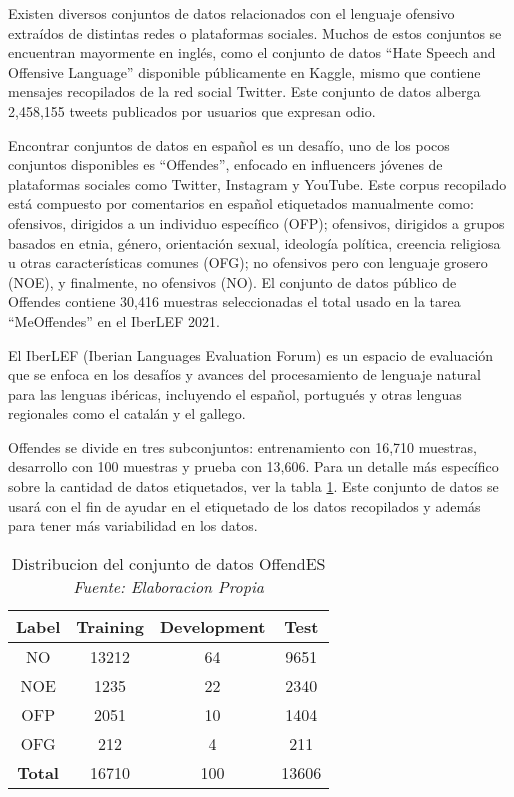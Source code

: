 Existen diversos conjuntos de datos relacionados con el lenguaje ofensivo extraídos de distintas redes o plataformas sociales. Muchos de estos conjuntos se encuentran mayormente en inglés, como el conjunto de datos ``Hate Speech and Offensive Language'' disponible públicamente en Kaggle, mismo que contiene mensajes recopilados de la red social Twitter. Este conjunto de datos alberga 2,458,155 tweets publicados por usuarios que expresan odio.

Encontrar conjuntos de datos en español es un desafío, uno de los pocos conjuntos disponibles es ``Offendes'', enfocado en influencers jóvenes de plataformas sociales como Twitter, Instagram y YouTube. Este corpus recopilado está compuesto por comentarios en español etiquetados manualmente como: ofensivos, dirigidos a un individuo específico (OFP); ofensivos, dirigidos a grupos basados en etnia, género, orientación sexual, ideología política, creencia religiosa u otras características comunes (OFG); no ofensivos pero con lenguaje grosero (NOE), y finalmente, no ofensivos (NO). El conjunto de datos público de Offendes contiene 30,416 muestras seleccionadas el total usado en la tarea ``MeOffendes'' en el IberLEF 2021. 

El IberLEF (Iberian Languages Evaluation Forum) es un espacio de evaluación que se enfoca en los desafíos y avances del procesamiento de lenguaje natural para las lenguas ibéricas, incluyendo el español, portugués y otras lenguas regionales como el catalán y el gallego.

Offendes se divide en tres subconjuntos: entrenamiento con 16,710 muestras, desarrollo con 100 muestras y prueba con 13,606. Para un detalle más específico sobre la cantidad de datos etiquetados, ver la tabla \ref{tbl:13}. Este conjunto de datos se usará con el fin de ayudar en el etiquetado de los datos recopilados y además para tener más variabilidad en los datos.

\begin{table}[!ht]
	\centering
	\begin{tabular}{|c|c|c|c|}
		\hline
		\textbf{Label} & \textbf{Training} & \textbf{Development} & \textbf{Test} \\ \hline
		NO & 13212 & 64 & 9651 \\ 
		NOE & 1235 & 22 & 2340 \\ 
		OFP & 2051 & 10 & 1404 \\ 
		OFG & 212 & 4 & 211 \\ \hline
		\textbf{Total} & 16710 & 100 & 13606 \\ \hline
	\end{tabular}
	\caption[Distribucion del conjunto de datos OffendES]{Distribucion del conjunto de datos OffendES
		\\\textit{Fuente: Elaboracion Propia}}
	\label{tbl:13}
\end{table}

